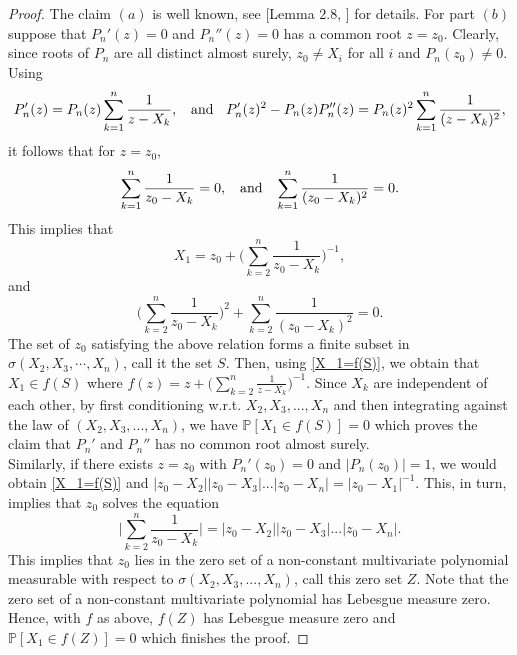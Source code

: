 \documentclass[9pt,a4paper,reqno]{amsart}
\theoremstyle{mine}
\newtheorem{remark}[thm]{Remark}
\theoremstyle{definition}
\theoremstyle{remark}
\newcommand{\mb}{\mathbb}
\begin{document}
\begin{proof}
The claim $(a)$ is well known, see [Lemma $2.8$, \cite{Ghosh-numberofcomponents}] for details. For part $(b)$ suppose that $P_n'(z) = 0$ and $P_n''(z)=0$ has a common root $z=z_0$. Clearly, since roots of $P_n$ are all distinct almost surely, $z_0 \neq X_i$ for all $i$ and $P_n(z_0) \neq 0$. Using 
\[ P_n'(z) = P_n(z) \sum_{k=1}^n \frac{1}{z-X_k}, \textrm{ \hspace{2mm}and \hspace{2mm}} P_n'(z)^2 - P_n(z)P_n''(z)  = P_n(z)^2 \sum_{k=1}^n \frac{1}{(z-X_k)^2}, \]
it follows that for $z=z_0$, \[\sum_{k=1}^n \frac{1}{z_0-X_k} = 0, \textrm{ \hspace{2mm}and \hspace{2mm}} \sum_{k=1}^n \frac{1}{(z_0-X_k)^2} = 0.\]
This implies that 
\begin{equation}\label{X_1=f(S)}
    X_1 = z_0 + \biggl(\sum_{k=2}^n \frac{1}{z_0-X_k}\biggr)^{-1},
\end{equation} 
and \[\biggl(\sum_{k=2}^n \frac{1}{z_0-X_k}\biggr)^2 + \sum_{k=2}^n \frac{1}{(z_0-X_k)^2} = 0. \]
The set of $z_0$ satisfying the above relation forms a finite subset in $\sigma(X_2, X_3,\cdots, X_n)$, call it the set $S$. Then, using \eqref{X_1=f(S)}, we obtain that $X_1 \in f(S)$ where $f(z) = z + \bigl(\sum_{k=2}^n \frac{1}{z-X_k}\bigr)^{-1}$. Since $X_k$ are independent of each other, by first conditioning w.r.t. $X_2, X_3,...,X_n$ and then integrating against the law of $(X_2, X_3,...,X_n)$, we have $\mb{P}[X_1 \in f(S)] =0$ which proves the claim that $P_n'$ and $P_n''$ has no common root almost surely. \\

Similarly, if there exists $z=z_0$ with $P_n'(z_0) =0 $ and $|P_n(z_0)| =1 $, we would obtain \eqref{X_1=f(S)} and $|z_0-X_2||z_0 -X_3|...|z_0-X_n| = |z_0-X_1|^{-1}$. This, in turn, implies that $z_0$ solves the equation 
\[ \bigl|\sum_{k=2}^n \frac{1}{z_0 - X_k}\bigr| =|z_0-X_2||z_0 -X_3|...|z_0-X_n|. \]
This implies that $z_0$ lies in the zero set of a non-constant multivariate polynomial measurable with respect to $\sigma(X_2, X_3,..., X_n)$, call this zero set $Z$. Note that the zero set of a non-constant multivariate polynomial has Lebesgue measure zero. Hence, with $f$ as above, $f(Z)$ has Lebesgue measure zero and $\mb{P}[X_1 \in f(Z)] =0$ which finishes the proof.  
\end{proof}


\end{document}
